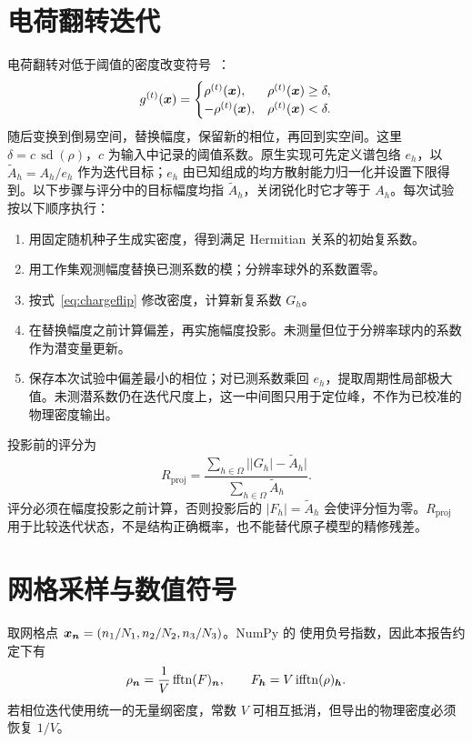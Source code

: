 \section{电荷翻转迭代}
电荷翻转对低于阈值的密度改变符号~\cite{chargeflip2004}：
\begin{equation}
g^{(t)}(\bm{x})=
\begin{cases}
\rho^{(t)}(\bm{x}),&\rho^{(t)}(\bm{x})\ge\delta,\\
-\rho^{(t)}(\bm{x}),&\rho^{(t)}(\bm{x})<\delta.
\end{cases}
\label{eq:chargeflip}
\end{equation}
随后变换到倒易空间，替换幅度，保留新的相位，再回到实空间。这里 $\delta=c\,\operatorname{sd}(\rho)$，$c$ 为输入中记录的阈值系数。原生实现可先定义谱包络 $e_h$，以 $\widetilde A_h=A_h/e_h$ 作为迭代目标；$e_h$ 由已知组成的均方散射能力归一化并设置下限得到。以下步骤与评分中的目标幅度均指 $\widetilde A_h$，关闭锐化时它才等于 $A_h$。每次试验按以下顺序执行：
\begin{enumerate}
\item 用固定随机种子生成实密度，得到满足 Hermitian 关系的初始复系数。
\item 用工作集观测幅度替换已测系数的模；分辨率球外的系数置零。
\item 按式~\eqref{eq:chargeflip} 修改密度，计算新复系数 $G_h$。
\item 在替换幅度之前计算偏差，再实施幅度投影。未测量但位于分辨率球内的系数作为潜变量更新。
\item 保存本次试验中偏差最小的相位；对已测系数乘回 $e_h$，提取周期性局部极大值。未测潜系数仍在迭代尺度上，这一中间图只用于定位峰，不作为已校准的物理密度输出。
\end{enumerate}
投影前的评分为
\begin{equation}
R_{\mathrm{proj}}=\frac{\sum_{h\in\Omega}\big||G_h|-\widetilde A_h\big|}
{\sum_{h\in\Omega}\widetilde A_h}.
\end{equation}
评分必须在幅度投影之前计算，否则投影后的 $|F_h|=\widetilde A_h$ 会使评分恒为零。$R_{\mathrm{proj}}$ 用于比较迭代状态，不是结构正确概率，也不能替代原子模型的精修残差。

\section{网格采样与数值符号}
取网格点 $\bm{x}_{\bm{n}}=(n_1/N_1,n_2/N_2,n_3/N_3)$。NumPy 的  使用负号指数，因此本报告约定下有
\begin{equation}
\rho_{\bm{n}}=\frac{1}{V}\operatorname{fftn}(F)_{\bm{n}},\qquad
F_{\bm{h}}=V\operatorname{ifftn}(\rho)_{\bm{h}}.
\end{equation}
若相位迭代使用统一的无量纲密度，常数 $V$ 可相互抵消，但导出的物理密度必须恢复 $1/V$。

